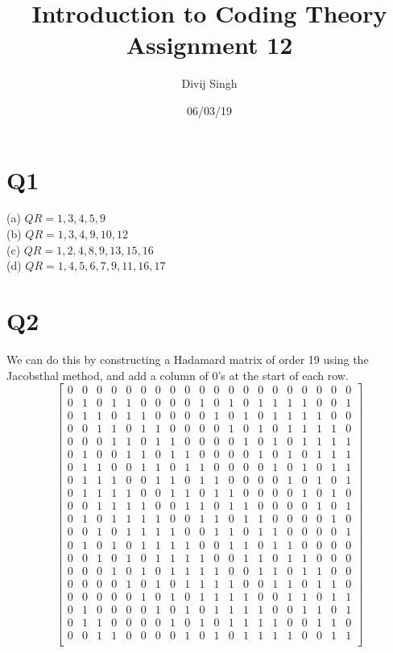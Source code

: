 \documentclass{article}
\title{Introduction to Coding Theory Assignment 12}
\author{Divij Singh}
\date{06/03/19}
\begin{document}
\maketitle
\section{Q1}

(a) $QR =  1,3,4,5,9$\\
(b) $QR =  1,3,4,9,10,12$\\
(c) $QR =  1,2,4,8,9,13,15,16$\\
(d) $QR =  1,4,5,6,7,9,11,16,17$

\section{Q2}
\setcounter{MaxMatrixCols}{20}
We can do this by constructing a Hadamard matrix of order 19 using the Jacobsthal method, and add a column of 0's at the start of each row.
\[
\begin{bmatrix}
0&0&0&0&0&0&0&0&0&0&0&0&0&0&0&0&0&0&0&0\\
0&1&0&1&1&0&0&0&0&1&0&1&0&1&1&1&1&0&0&1\\
0&1&1&0&1&1&0&0&0&0&1&0&1&0&1&1&1&1&0&0\\
0&0&1&1&0&1&1&0&0&0&0&1&0&1&0&1&1&1&1&0\\
0&0&0&1&1&0&1&1&0&0&0&0&1&0&1&0&1&1&1&1\\
0&1&0&0&1&1&0&1&1&0&0&0&0&1&0&1&0&1&1&1\\
0&1&1&0&0&1&1&0&1&1&0&0&0&0&1&0&1&0&1&1\\
0&1&1&1&0&0&1&1&0&1&1&0&0&0&0&1&0&1&0&1\\
0&1&1&1&1&0&0&1&1&0&1&1&0&0&0&0&1&0&1&0\\
0&0&1&1&1&1&0&0&1&1&0&1&1&0&0&0&0&1&0&1\\
0&1&0&1&1&1&1&0&0&1&1&0&1&1&0&0&0&0&1&0\\
0&0&1&0&1&1&1&1&0&0&1&1&0&1&1&0&0&0&0&1\\
0&1&0&1&0&1&1&1&1&0&0&1&1&0&1&1&0&0&0&0\\
0&0&1&0&1&0&1&1&1&1&0&0&1&1&0&1&1&0&0&0\\
0&0&0&1&0&1&0&1&1&1&1&0&0&1&1&0&1&1&0&0\\
0&0&0&0&1&0&1&0&1&1&1&1&0&0&1&1&0&1&1&0\\
0&0&0&0&0&1&0&1&0&1&1&1&1&0&0&1&1&0&1&1\\
0&1&0&0&0&0&1&0&1&0&1&1&1&1&0&0&1&1&0&1\\
0&1&1&0&0&0&0&1&0&1&0&1&1&1&1&0&0&1&1&0\\
0&0&1&1&0&0&0&0&1&0&1&0&1&1&1&1&0&0&1&1\\
\end{bmatrix}
\]
	
\end{document}
